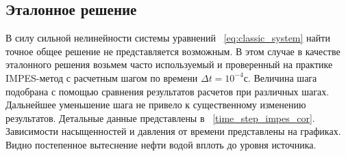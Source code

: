 \subsection{Эталонное решение}
\label{reference sample}
В силу сильной нелинейности системы уравнений ~\ref{eq:classic_system} найти точное общее решение не представляется возможным.
В этом случае в качестве эталонного решения возьмем часто используемый и проверенный на практике IMPES-метод с расчетным шагом по
времени $\Delta t = 10^{-4}\text{с}$. Величина шага подобрана с помощью сравнения результатов расчетов при различных шагах.
Дальнейшее уменьшение шага не привело к существенному изменению результатов. Детальные данные представлены в ~\ref{time_step_impes_cor}.
Зависимости насыщенностей и давления от времени представлены на графиках. Видно постепенное вытеснение нефти водой вплоть до уровня источника.

\newcommand{\printplotoned}[1]
{
\begin{figure}[h!]
\begin{center}
\begin{minipage}[h!]{0.49\textwidth}
\begin{tikzpicture}
  \begin{axis}[legend entries={$S_w$,$S_n$}, axis lines=left, xmax=5, xmin=0, ymax=1, ymin=0, enlargelimits=true, grid=major, width=1\textwidth, xlabel={$x$, м}, ylabel={$S$}]
    \pgfplotstableread[skip first n=1]{data/impes_#1.0s.out}{\mytable}
    \addplot [blue, ultra thick] table [x=0, y=2] {\mytable};
    \addplot [black, ultra thick] table [x=0, y expr=1-\thisrowno{2}] {\mytable};
  \end{axis}
\end{tikzpicture}
\caption{Насыщенности, t=#1с}
\label{t_10_s}
\end{minipage}
\hfill
\begin{minipage}[h!]{0.49\textwidth}
\begin{tikzpicture}
 \begin{axis}[axis lines=left, xmax=5, xmin=0, ymax=330, ymin=300, enlargelimits=true, grid=major, width=1\textwidth, xlabel={$x$, м}, ylabel={$P$, атм}]
    \pgfplotstableread[skip first n=1]{data/impes_#1.0s.out}{\mytable}
    \addplot [green, ultra thick] table [x=0, y=1] {\mytable};
  \end{axis}
\end{tikzpicture}
\caption{Давление, t=#1с}
\label{t_10_p}
\end{minipage}
\end{center}
\end{figure}
}

